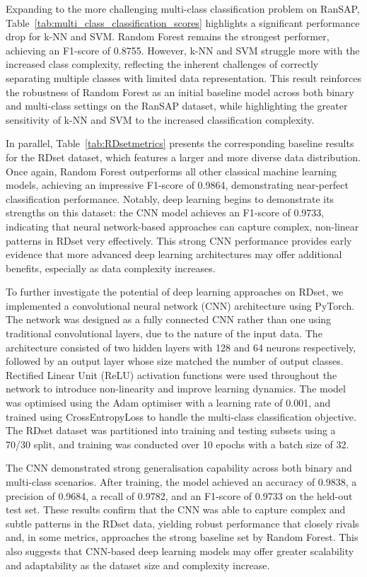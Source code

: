 Expanding to the more challenging multi-class classification problem on RanSAP, Table~\ref{tab:multi_class_classification_scores} highlights a significant performance drop for k-NN and SVM. Random Forest remains the strongest performer, achieving an F1-score of 0.8755. However, k-NN and SVM struggle more with the increased class complexity, reflecting the inherent challenges of correctly separating multiple classes with limited data representation. This result reinforces the robustness of Random Forest as an initial baseline model across both binary and multi-class settings on the RanSAP dataset, while highlighting the greater sensitivity of k-NN and SVM to the increased classification complexity.

In parallel, Table~\ref{tab:RDsetmetrics} presents the corresponding baseline results for the RDset dataset, which features a larger and more diverse data distribution. Once again, Random Forest outperforms all other classical machine learning models, achieving an impressive F1-score of 0.9864, demonstrating near-perfect classification performance. Notably, deep learning begins to demonstrate its strengths on this dataset: the CNN model achieves an F1-score of 0.9733, indicating that neural network-based approaches can capture complex, non-linear patterns in RDset very effectively. This strong CNN performance provides early evidence that more advanced deep learning architectures may offer additional benefits, especially as data complexity increases.

To further investigate the potential of deep learning approaches on RDset, we implemented a convolutional neural network (CNN) architecture using PyTorch. The network was designed as a fully connected CNN rather than one using traditional convolutional layers, due to the nature of the input data. The architecture consisted of two hidden layers with 128 and 64 neurons respectively, followed by an output layer whose size matched the number of output classes. Rectified Linear Unit (ReLU) activation functions were used throughout the network to introduce non-linearity and improve learning dynamics. The model was optimised using the Adam optimiser with a learning rate of 0.001, and trained using CrossEntropyLoss to handle the multi-class classification objective. The RDset dataset was partitioned into training and testing subsets using a 70/30 split, and training was conducted over 10 epochs with a batch size of 32.

The CNN demonstrated strong generalisation capability across both binary and multi-class scenarios. After training, the model achieved an accuracy of 0.9838, a precision of 0.9684, a recall of 0.9782, and an F1-score of 0.9733 on the held-out test set. These results confirm that the CNN was able to capture complex and subtle patterns in the RDset data, yielding robust performance that closely rivals and, in some metrics, approaches the strong baseline set by Random Forest. This also suggests that CNN-based deep learning models may offer greater scalability and adaptability as the dataset size and complexity increase.


